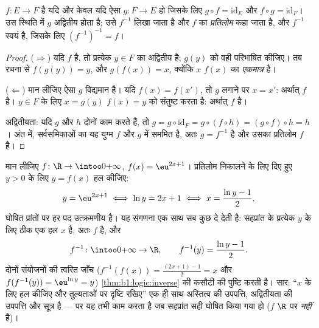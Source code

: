 \begin{theorem}[प्रतिलोम प्रतिचित्रण]\label{thm:b1:logic:inverse}
 $f \colon E \to F$  है यदि और केवल यदि ऐसा
 $g \colon F \to E$ हो जिसके लिए $g \circ f = \mathrm{id}_E$ और
$f \circ g = \mathrm{id}_F$। उस स्थिति में $g$ अद्वितीय होता है; उसे
$f^{-1}$ लिखा जाता है और $f$ का \emph{प्रतिलोम} कहा जाता है, और $f^{-1}$
स्वयं  है, जिसके लिए $(f^{-1})^{-1} = f$।
\end{theorem}

\begin{proof}
($\Rightarrow$) यदि $f$  है, तो प्रत्येक $y \in F$ का अद्वितीय
 है; $g(y)$ को वही  परिभाषित कीजिए। तब रचना से
$f(g(y)) = y$, और $g(f(x)) = x$, क्योंकि $x$ $f(x)$ का \emph{एकमात्र}
 है।

($\Leftarrow$) मान लीजिए ऐसा $g$ विद्यमान है। यदि $f(x) = f(x')$, तो $g$
लगाने पर $x = x'$: अर्थात् $f$  है। $y \in F$ के लिए $x = g(y)$ $f(x) =
y$ को संतुष्ट करता है: अर्थात् $f$  है।

अद्वितीयता: यदि $g$ और $h$ दोनों काम करते हैं, तो $g = g \circ \mathrm{id}_F
= g \circ (f \circ h) = (g \circ f) \circ h = h$। अंत में, सर्वसमिकाओं का यह
युग्म $f$ और $g$ में सममित है, अतः $g = f^{-1}$  है और उसका
प्रतिलोम $f$ है।
\end{proof}

\begin{example}\label{ex:b1:logic:inversecomp}
मान लीजिए $f \colon \R \to \intoo0{+\infty}$, $f(x) = \eu^{2x+1}$। प्रतिलोम
निकालने के लिए दिए हुए $y > 0$ के लिए $y = f(x)$ हल कीजिए:
\[
y = \eu^{2x+1} \iff \ln y = 2x + 1 \iff x = \frac{\ln y - 1}2 ,
\]
घोषित प्रांतों पर हर पद उत्क्रमणीय है। यह संगणना एक साथ सब कुछ दे देती है:
सहप्रांत के प्रत्येक $y$ के लिए ठीक एक हल $x$ है, अतः $f$  है,
और
\[
f^{-1} \colon \intoo0{+\infty} \to \R,
\qquad
f^{-1}(y) = \frac{\ln y - 1}2 .
\]
दोनों संयोजनों की त्वरित जाँच ($f^{-1}(f(x)) = \frac{(2x+1) - 1}2 = x$ और
$f(f^{-1}(y)) = \eu^{\ln y} = y$) \cref{thm:b1:logic:inverse} की कसौटी की
पुष्टि करती है। सार: ``$x$ के लिए हल कीजिए और तुल्यताओं पर दृष्टि रखिए'' एक
ही साथ अस्तित्व की उपपत्ति, अद्वितीयता की उपपत्ति और सूत्र है --- पर यह तभी
काम करता है जब सहप्रांत सही घोषित किया गया हो ($f$ $\R$ पर 
\emph{नहीं} है)।
\end{example}

